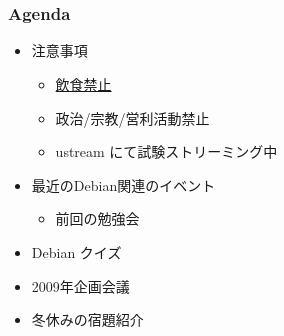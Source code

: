 \newenvironment{commandline0}%
{\VerbatimEnvironment
  \begin{Sbox}\begin{minipage}{0.95\hsize}\begin{fontsize}{9}{9} \begin{BVerbatim}}%
{\end{BVerbatim}\end{fontsize}\end{minipage}\end{Sbox}
  \setlength{\fboxsep}{10pt}

\vspace{10pt}%
\fcolorbox{dancerdarkblue}{dancerlightblue}{\TheSbox}

\vspace{6pt}%
}



\frame{\titlepage{}}


\section{}
\begin{frame}
 \frametitle{Agenda}
\begin{minipage}[t]{0.45\hsize}
  \begin{itemize}
  \item 注意事項
	\begin{itemize}
	 \item \underline{飲食禁止}
	 \item 政治/宗教/営利活動禁止
	 \item ustream にて試験ストリーミング中
	\end{itemize}
  \item 最近のDebian関連のイベント
	\begin{itemize}
	 \item 前回の勉強会
	\end{itemize}
 \end{itemize}
\end{minipage}
\begin{minipage}[t]{0.45\hsize}
 \begin{itemize}
  \item Debian クイズ
  \item 2009年企画会議
  \item 冬休みの宿題紹介
 \end{itemize}
\end{minipage}
\end{frame}


